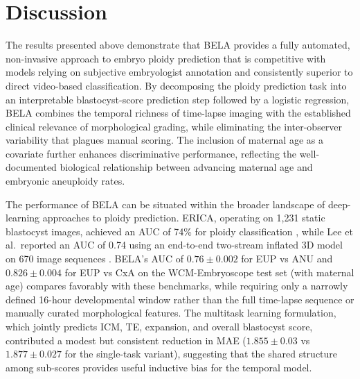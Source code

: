 \documentclass[11pt]{article}
\begin{document}
\section{Discussion}

The results presented above demonstrate that BELA provides a fully automated, non-invasive approach to embryo ploidy prediction that is competitive with models relying on subjective embryologist annotation and consistently superior to direct video-based classification. By decomposing the ploidy prediction task into an interpretable blastocyst-score prediction step followed by a logistic regression, BELA combines the temporal richness of time-lapse imaging with the established clinical relevance of morphological grading, while eliminating the inter-observer variability that plagues manual scoring. The inclusion of maternal age as a covariate further enhances discriminative performance, reflecting the well-documented biological relationship between advancing maternal age and embryonic aneuploidy rates.

The performance of BELA can be situated within the broader landscape of deep-learning approaches to ploidy prediction. ERICA, operating on 1{,}231 static blastocyst images, achieved an AUC of 74\% for ploidy classification \citep{chavezbadiola2020erica}, while Lee et al.\ reported an AUC of 0.74 using an end-to-end two-stream inflated 3D model on 670 image sequences \citep{lee2021endtoend}. BELA's AUC of $0.76 \pm 0.002$ for EUP vs ANU and $0.826 \pm 0.004$ for EUP vs CxA on the WCM-Embryoscope test set (with maternal age) compares favorably with these benchmarks, while requiring only a narrowly defined 16-hour developmental window rather than the full time-lapse sequence or manually curated morphological features. The multitask learning formulation, which jointly predicts ICM, TE, expansion, and overall blastocyst score, contributed a modest but consistent reduction in MAE ($1.855 \pm 0.03$ vs $1.877 \pm 0.027$ for the single-task variant), suggesting that the shared structure among sub-scores provides useful inductive bias for the temporal model.
\end{document}
